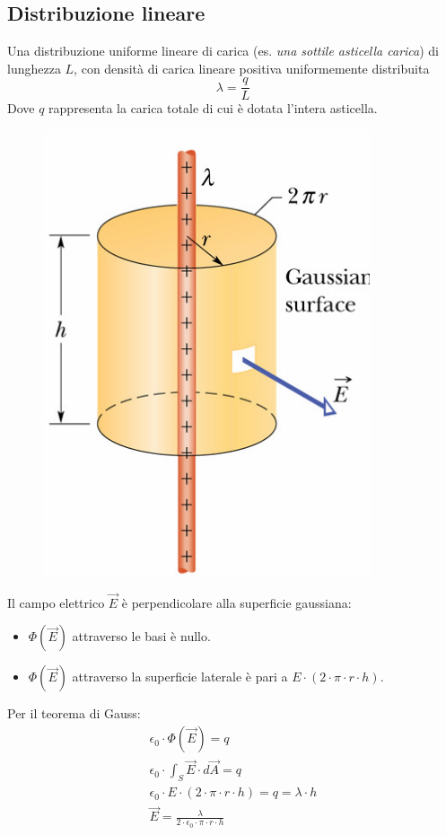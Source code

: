 \subsection{Distribuzione lineare}
Una distribuzione uniforme lineare di carica (es. \textit{una sottile asticella carica}) di lunghezza $L$, con densità di carica lineare positiva uniformemente distribuita
$$\lambda = \frac{q}{L}$$
Dove $q$ rappresenta la carica totale di cui è dotata l'intera asticella.
    \begin{figure}[h!]
    	\centering
    	\includegraphics[scale=0.4]{esempio3.png}
    \end{figure}
Il campo elettrico $\vec{E}$ è perpendicolare alla superficie gaussiana:
	\begin{itemize}
    	\item{$\Phi(\vec{E})$ attraverso le basi è nullo.}
        \item{$\Phi(\vec{E})$ attraverso la superficie laterale è pari a $E \cdot (2 \cdot \pi \cdot r \cdot h)$.}
    \end{itemize}
Per il teorema di Gauss:
	\begin{displaymath}\begin{aligned}
		\epsilon_0 \cdot \Phi(\vec{E}) = q\\
        \epsilon_0 \cdot \int_S \vec{E} \cdot d\vec{A} = q\\
        \epsilon_0 \cdot E \cdot (2 \cdot \pi \cdot r \cdot h) = q = \lambda \cdot h\\
        \vec{E} = \frac{\lambda}{2 \cdot \epsilon_0 \cdot \pi \cdot r \cdot h}
	\end{aligned}\end{displaymath}
  
